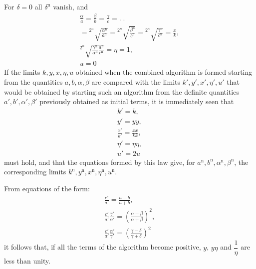 For $\delta=0$ all $\delta^{\mathrm n}$ vanish, and
\[
\begin{gathered}\frac\alpha a=\frac\beta b=\frac\gamma c=.\;.
\\={}^{2^n}\!\surd{\frac{\alpha^{\mathrm n}}{a^{\mathrm n}}}
={}^{2^n}\!\surd{\frac{\beta^{\mathrm n}}{b^{\mathrm n}}}
={}^{2^n}\!\surd{\frac{\gamma^{\mathrm n}}{c^{\mathrm n}}}=\frac xk,\\[5pt]
{}^{2^n}\!\surd{\frac{\gamma^{\mathrm n}}{\alpha^{\mathrm n}}\frac{a^{\mathrm n}}{c^{\mathrm n}}}=\eta=1,\\[5pt] u=0\end{gathered}
\]
If the limits $k,\allowbreak y,\allowbreak x,\allowbreak \eta,\allowbreak u$ obtained when the combined algorithm is formed starting from the quantities $a,\allowbreak b,\allowbreak \alpha,\allowbreak \beta$ are compared with the limits $k',\allowbreak y',\allowbreak x',\allowbreak \eta',\allowbreak u'$ that would be obtained by starting such an algorithm from the definite quantities $a',\allowbreak b',\allowbreak \alpha',\allowbreak \beta'$ previously obtained as initial terms, it is immediately seen that
\[
\begin{gathered}k'=k,\\[5pt] y'=yy,\\[5pt]\frac{x'}{k'}=\frac{xx}{kk},\\[5pt]
\eta'=\eta\eta,\\[5pt] u'=2u\end{gathered}
\]
must hold, and that the equations formed by this law give, for $a^{\mathrm n},\allowbreak b^{\mathrm n},\allowbreak \alpha^{\mathrm n},\allowbreak \beta^{\mathrm n}$, the corresponding limits $k^{\mathrm n},\allowbreak y^{\mathrm n},\allowbreak x^{\mathrm n},\allowbreak \eta^{\mathrm n},\allowbreak u^{\mathrm n}$.

From equations of the form:
\[
\begin{gathered}\frac{c'}{a'}=\frac{a-b}{a+b},\\[5pt]
\frac{c'}{a'}\frac{\gamma'}{\alpha'}=\left(\frac{\alpha-\beta}{\alpha+\beta}\right)^2,\\[5pt]
\frac{c'}{a'}\frac{\alpha'}{\gamma'}=\left(\frac{\gamma-\delta}{\gamma+\delta}\right)^2\end{gathered}
\]
it follows that, if all the terms of the algorithm become positive, $y$, $y\eta$ and
$\dfrac1\eta$ are less than unity.

